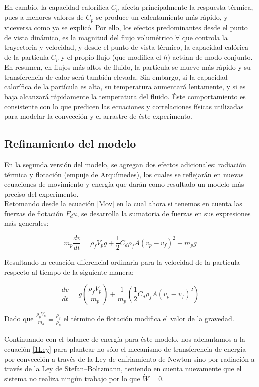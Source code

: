 \documentclass[11pt,stdletter,orderfromtodate,sigleft,twoside]{report}
\begin{document}
En cambio, la capacidad calorífica $C_p$ afecta principalmente la respuesta térmica, pues a menores valores de $C_p$ se produce un calentamiento más rápido, y viceversa como ya se explicó. Por ello, los efectos predominantes desde el punto de vista dinámico, es la magnitud del flujo volumétrico $\forall$ que controla la trayectoria y velocidad, y desde el punto de vista térmico, la capacidad calórica de la partícula $C_p$ y el propio flujo (que modifica el $h$) actúan de modo conjunto. En resumen, en flujos más altos de fluido, la partícula se mueve más rápido y su transferencia de calor será también elevada. Sin embargo, si la capacidad calorífica de la partícula es alta, su temperatura aumentará lentamente, y si es 
baja alcanzará rápidamente la temperatura del fluido. Éste comportamiento es consistente con lo que predicen las ecuaciones y correlaciones físicas utilizadas para modelar la convección y el arrastre de éste experimento.

\subsection{Refinamiento del modelo}
En la segunda versión del modelo, se agregan dos efectos adicionales: radiación térmica y flotación (empuje de Arquímedes), los cuales se reflejarán en nuevas ecuaciones de movimiento y energía que darán como resultado un modelo más preciso del experimento.\\

Retomando desde la ecuación \ref{Mov} en la cual ahora si tenemos en cuenta las fuerzas de flotación $F_du$, se desarrolla la sumatoria de fuerzas en sus expresiones más generales:

\begin{equation}
    m_{p}\frac{dv}{dt}=\rho_{f}V_{p}g +\frac{1}{2}C_{d}\rho_f A (v_{p}-v_{f})^{2}-m_{p}g
\end{equation}

Resultando la ecuación diferencial ordinaria para la velocidad de la partícula respecto al tiempo de la siguiente manera:

\begin{equation}
    \frac{dv}{dt}=g(\frac{\rho_{f}V_{p}}{m_{p}})+\frac{1}{m_{p}}(\frac{1}{2}C_{d}\rho_f A (v_{p}-v_{f})^{2})
\end{equation}

Dado que $\frac{\rho_{p}V_{p}}{m_{b}}=\frac{\rho_{f}}{\rho_{p}}$ el término de flotación modifica el valor de la gravedad.

Continuando con el balance de energía para éste modelo, nos adelantamos a la ecuación \ref{1Ley} para plantear no sólo el mecanismo de transferencia de energía por convección a través de la Ley de enfriamiento de Newton sino por radiación a través de la Ley de Stefan–Boltzmann, teniendo en cuenta nuevamente que el sistema no realiza ningún trabajo por lo que $\dot{W}=0$.
\end{document}
